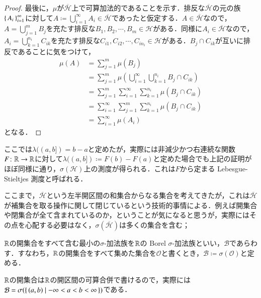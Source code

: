 \begin{proof}
最後に，$\mu$が$\overline{\mathcal{H}}$上で可算加法的であることを示す．排反な$\overline{\mathcal{H}}$の元の族$\set{A_i}_{i=1}^\infty$に対して$A \coloneqq \bigcup_{i=1}^\infty A_i \in \overline{\mathcal{H}}$であったと仮定する．$A \in \overline{\mathcal{H}}$なので，$A = \bigcup_{j=1}^m B_j$を充たす排反な$B_1, B_2, \cdots, B_m \in \mathcal{H}$がある．同様に$A_i \in \overline{\mathcal{H}}$なので，$A_i = \bigcup_{k=1}^{n_i} C_{ik}$を充たす排反な$C_{i1},C_{i2},\cdots,C_{in_i} \in \mathcal{H}$がある．$B_j \cap C_{ik}$が互いに排反であることに気をつけて，
\begin{align}
\mu(A) &= \sum_{j=1}^m \mu(B_j) \\
&= \sum_{j=1}^m \mu\left(\bigcup_{i=1}^\infty \bigcup_{k=1}^{n_i} B_j \cap C_{ik} \right) \\
&= \sum_{j=1}^m \sum_{i=1}^\infty \sum_{k=1}^{n_i} \mu\left( B_j \cap C_{ik} \right) \\
&= \sum_{i=1}^\infty \sum_{j=1}^m \sum_{k=1}^{n_i} \mu\left( B_j \cap C_{ik} \right) \\
&= \sum_{i=1}^\infty \mu\left( A_i \right)
\end{align}となる．
\end{proof}


\begin{que}[*]
ここでは$\lambda((a,b])=b-a$と定めたが，実際には非減少かつ右連続な関数$F \colon \mathbb{R} \to \mathbb{R}$に対して$\lambda((a,b])\coloneqq F(b)-F(a)$と定めた場合でも上記の証明がほぼ同様に通り，$\sigma(\mathcal{H})$上の測度が得られる．これは$F$から定まる Lebesgue-Stieltjes 測度と呼ばれる．
\end{que}

ここまで，$\overline{\mathcal{H}}$という左半開区間の和集合からなる集合を考えてきたが，これは$\overline{\mathcal{H}}$が補集合を取る操作に関して閉じているという技術的事情による．例えば開集合や閉集合が全て含まれているのか，ということが気になると思うが，実際にはその点を心配する必要はなく，$\sigma\left(\overline{\mathcal{H}}\right)$は多くの集合を含む；

\begin{defi}
$\mathbb{R}$の開集合をすべて含む最小の$\sigma$-加法族を$\mathbb{R}$の Borel $\sigma$-加法族といい，$\mathcal{B}$であらわす．すなわち，$\mathbb{R}$の開集合をすべて集めた集合を$\mathscr{O}$と書くとき，$\mathcal{B} \coloneqq \sigma(\mathscr{O})$と定める．
\end{defi}

\begin{que}
$\mathbb{R}$の開集合は$\mathbb{R}$の開区間の可算合併で書けるので，実際には$\mathcal{B} = \sigma(\set{(a,b) | -\infty < a < b < \infty })$である．
\end{que}

